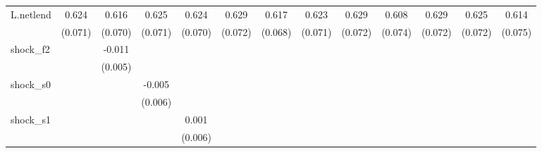 {\begin{tabular}{l*{12}{c}}
\addlinespace
L.netlend   &       0.624\sym{***}&       0.616\sym{***}&       0.625\sym{***}&       0.624\sym{***}&       0.629\sym{***}&       0.617\sym{***}&       0.623\sym{***}&       0.629\sym{***}&       0.608\sym{***}&       0.629\sym{***}&       0.625\sym{***}&       0.614\sym{***}\\
            &     (0.071)         &     (0.070)         &     (0.071)         &     (0.070)         &     (0.072)         &     (0.068)         &     (0.071)         &     (0.072)         &     (0.074)         &     (0.072)         &     (0.072)         &     (0.075)         \\
\addlinespace
shock\_f2    &                     &      -0.011\sym{**} &                     &                     &                     &                     &                     &                     &                     &                     &                     &                     \\
            &                     &     (0.005)         &                     &                     &                     &                     &                     &                     &                     &                     &                     &                     \\
\addlinespace
shock\_s0    &                     &                     &      -0.005         &                     &                     &                     &                     &                     &                     &                     &                     &                     \\
            &                     &                     &     (0.006)         &                     &                     &                     &                     &                     &                     &                     &                     &                     \\
\addlinespace
shock\_s1    &                     &                     &                     &       0.001         &                     &                     &                     &                     &                     &                     &                     &                     \\
            &                     &                     &                     &     (0.006)         &                     &                     &                     &                     &                     &                     &                     &                     \\

\end{tabular}}
